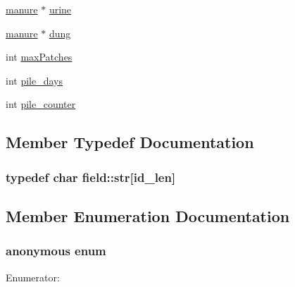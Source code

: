 \begin{DoxyCompactItemize}
\item 
\hyperlink{classmanure}{manure} $\ast$ \hyperlink{classfield_a5651ea96e5367910b5753a22bafb374e}{urine}
\item 
\hyperlink{classmanure}{manure} $\ast$ \hyperlink{classfield_a70a2a287278fc7614895337ecebd75ea}{dung}
\item 
int \hyperlink{classfield_aaedb741713027149afc17d7ff0424862}{maxPatches}
\item 
int \hyperlink{classfield_af985296d2be7e23cb70d38ca5e3da62c}{pile\_\-days}
\item 
int \hyperlink{classfield_a5ea1d24702e131374c0a8c4951eb2a5e}{pile\_\-counter}
\end{DoxyCompactItemize}


\subsection{Member Typedef Documentation}
\hypertarget{classfield_a6f1744c3ac290d5fc0ef66302c0ec632}{
\subsubsection[{str}]{\setlength{\rightskip}{0pt plus 5cm}typedef char {\bf field::str}\mbox{[}id\_\-len\mbox{]}}}
\label{classfield_a6f1744c3ac290d5fc0ef66302c0ec632}


\subsection{Member Enumeration Documentation}
\hypertarget{classfield_ac9700210a8ba81db46722b7ee572a673}{
\subsubsection[{"@13}]{\setlength{\rightskip}{0pt plus 5cm}anonymous enum}}
\label{classfield_ac9700210a8ba81db46722b7ee572a673}
\begin{Desc}
\item[Enumerator: ]\par
\begin{description}
\item[{\em 
\hypertarget{classfield_ac9700210a8ba81db46722b7ee572a673ae55908c767f059fc8071dd960b9b63c9}{
MaxFixedCrops}
\label{classfield_ac9700210a8ba81db46722b7ee572a673ae55908c767f059fc8071dd960b9b63c9}
}]\end{description}
\end{Desc}


